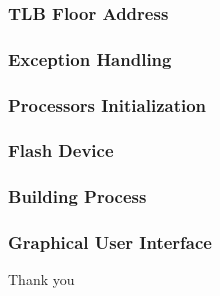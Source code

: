 \documentclass{beamer}
\begin{document}
\begin{frame}
	\frametitle{TLB Floor Address}
\end{frame}

\begin{frame}
	\frametitle{Exception Handling}
\end{frame}

\begin{frame}
	\frametitle{Processors Initialization}
\end{frame}

\begin{frame}
	\frametitle{Flash Device}
\end{frame}

\begin{frame}
	\frametitle{Building Process}
\end{frame}

\begin{frame}
	\frametitle{Graphical User Interface}
\end{frame}

\begin{frame}
	Thank you
\end{frame}
\end{document}
